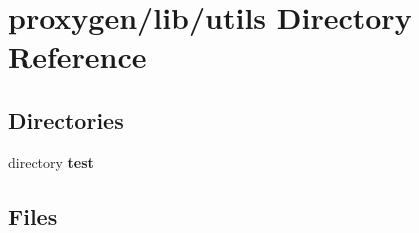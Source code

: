 \section{proxygen/lib/utils Directory Reference}
\label{dir_736717bac64c903277b300e102617b7e}
\subsection*{Directories}
\begin{DoxyCompactItemize}
\item 
directory {\bf test}
\end{DoxyCompactItemize}
\subsection*{Files}
